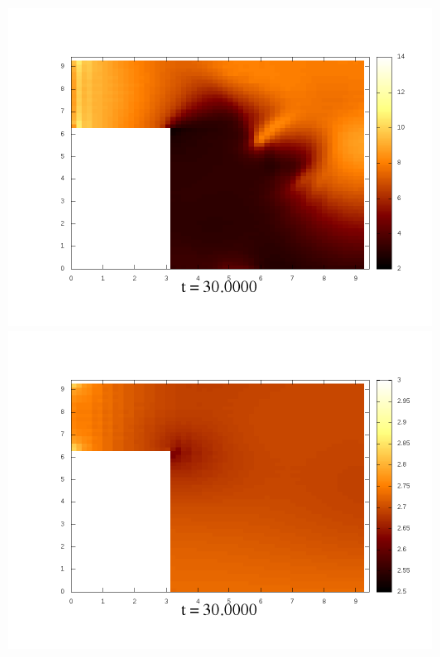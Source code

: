 \documentclass[a4paper, 12pt]{article}
\begin{document}
\begin{figure}[h]
	\begin{minipage}[h]{0.4\linewidth}
		\includegraphics[width=1\linewidth]{./img/01_1_1/G/150}
	\end{minipage}
	\hfill
	\begin{minipage}[h]{0.4\linewidth}
		\includegraphics[width=1\linewidth]{./img/01_1_01/G/150}
	\end{minipage}
\end{figure}
\end{document}
